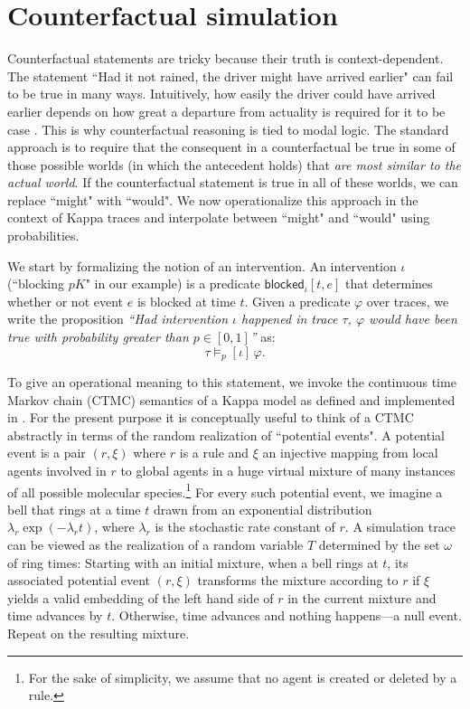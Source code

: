 
\section{Counterfactual simulation}\label{sec:counterfactual}

Counterfactual statements are tricky because their truth is context-dependent. The statement ``Had it not rained, the driver might have arrived earlier" can fail to be true in many ways. Intuitively, how easily the driver could have arrived earlier depends on how great a departure from actuality is required for it to be case \cite{Lewis1973}. This is why counterfactual reasoning is tied to modal logic. The standard approach is to require that the consequent in a counterfactual be true in some of those possible worlds (in which the antecedent holds) that \textit{are most similar to the actual world}. If the counterfactual statement is true in all of these worlds, we can replace ``might" with ``would".  We now operationalize this approach in the context of Kappa traces and interpolate between ``might" and ``would" using probabilities.

We start by formalizing the notion of an intervention. An intervention $\iota$ (``blocking $pK$" in our example) is a predicate $\textsf{blocked}_{\iota}[t, e]$ that determines whether or not event $e$ is blocked at time $t$. Given a predicate $\varphi$ over traces, we write the proposition \textit{``Had intervention $\iota$ happened in trace $\tau$, $\varphi$ would have been true with probability greater than $p \in [0,1]$''} as:
\[ 
\tau \models_p [\iota] \, \varphi.   
\]

To give an operational meaning to this statement, we invoke the continuous time Markov chain (CTMC) semantics of a Kappa model as defined and implemented in \cite{DanosEtAl-APLAS07,BoutillierEK17}. For the present purpose it is conceptually useful to think of a CTMC abstractly in terms of the random realization of ``potential events". A potential event is a pair $(r, \xi)$ where $r$ is a rule and $\xi$ an injective mapping from local agents involved in $r$ to global agents in a huge virtual mixture of many instances of all possible molecular species.\footnote{For the sake of simplicity, we assume that no agent is created or deleted by a rule.} For every such potential event, we imagine a bell that rings at a time $t$ drawn from an exponential distribution $\lambda_r\exp(-\lambda_r t)$, where $\lambda_r$ is the stochastic rate constant of $r$. A simulation trace can be viewed as the realization of a random variable $T$ determined by the set $\omega$ of ring times: Starting with an initial mixture, when a bell rings at $t$, its associated potential event $(r, \xi)$ transforms the mixture according to $r$ if $\xi$ yields a valid embedding of the left hand side of $r$ in the current mixture and time advances by $t$. Otherwise, time advances and nothing happens---a null event. Repeat on the resulting mixture.

